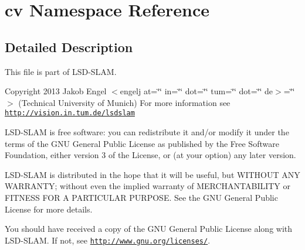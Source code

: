 \hypertarget{namespacecv}{\section{cv Namespace Reference}
\label{namespacecv}
}


\subsection{Detailed Description}
This file is part of L\-S\-D-\/\-S\-L\-A\-M.

Copyright 2013 Jakob Engel $<$engelj at=\char`\"{}\char`\"{} in=\char`\"{}\char`\"{} dot=\char`\"{}\char`\"{} tum=\char`\"{}\char`\"{} dot=\char`\"{}\char`\"{} de$>$=\char`\"{}\char`\"{}$>$ (Technical University of Munich) For more information see \href{http://vision.in.tum.de/lsdslam}{\tt http\-://vision.\-in.\-tum.\-de/lsdslam}

L\-S\-D-\/\-S\-L\-A\-M is free software\-: you can redistribute it and/or modify it under the terms of the G\-N\-U General Public License as published by the Free Software Foundation, either version 3 of the License, or (at your option) any later version.

L\-S\-D-\/\-S\-L\-A\-M is distributed in the hope that it will be useful, but W\-I\-T\-H\-O\-U\-T A\-N\-Y W\-A\-R\-R\-A\-N\-T\-Y; without even the implied warranty of M\-E\-R\-C\-H\-A\-N\-T\-A\-B\-I\-L\-I\-T\-Y or F\-I\-T\-N\-E\-S\-S F\-O\-R A P\-A\-R\-T\-I\-C\-U\-L\-A\-R P\-U\-R\-P\-O\-S\-E. See the G\-N\-U General Public License for more details.

You should have received a copy of the G\-N\-U General Public License along with L\-S\-D-\/\-S\-L\-A\-M. If not, see \href{http://www.gnu.org/licenses/}{\tt http\-://www.\-gnu.\-org/licenses/}. 